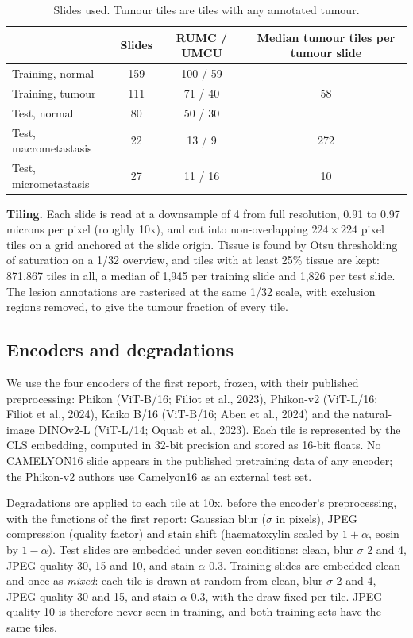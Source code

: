 \documentclass[11pt,a4paper]{article}
\begin{document}
\begin{table}[h]\centering\small
\caption{Slides used. Tumour tiles are tiles with any annotated tumour.}
\label{tab:data}
\begin{tabular}{@{}lccc@{}}
\toprule
 & Slides & RUMC / UMCU & Median tumour tiles per tumour slide\\
\midrule
Training, normal & 159 & 100 / 59 & \\
Training, tumour & 111 & 71 / 40 & 58\\
Test, normal & 80 & 50 / 30 & \\
Test, macrometastasis & 22 & 13 / 9 & 272\\
Test, micrometastasis & 27 & 11 / 16 & 10\\
\bottomrule
\end{tabular}
\end{table}

\textbf{Tiling.} Each slide is read at a downsample of 4 from full resolution, 0.91 to 0.97 microns per pixel (roughly 10x), and cut into non-overlapping $224 \times 224$ pixel tiles on a grid anchored at the slide origin. Tissue is found by Otsu thresholding of saturation on a 1/32 overview, and tiles with at least 25\% tissue are kept: 871,867 tiles in all, a median of 1,945 per training slide and 1,826 per test slide. The lesion annotations are rasterised at the same 1/32 scale, with exclusion regions removed, to give the tumour fraction of every tile.

\subsection{Encoders and degradations}

We use the four encoders of the first report, frozen, with their published preprocessing: Phikon (ViT-B/16; Filiot et al., 2023), Phikon-v2 (ViT-L/16; Filiot et al., 2024), Kaiko B/16 (ViT-B/16; Aben et al., 2024) and the natural-image DINOv2-L (ViT-L/14; Oquab et al., 2023). Each tile is represented by the CLS embedding, computed in 32-bit precision and stored as 16-bit floats. No CAMELYON16 slide appears in the published pretraining data of any encoder; the Phikon-v2 authors use Camelyon16 as an external test set.

Degradations are applied to each tile at 10x, before the encoder's preprocessing, with the functions of the first report: Gaussian blur ($\sigma$ in pixels), JPEG compression (quality factor) and stain shift (haematoxylin scaled by $1+\alpha$, eosin by $1-\alpha$). Test slides are embedded under seven conditions: clean, blur $\sigma$ 2 and 4, JPEG quality 30, 15 and 10, and stain $\alpha$ 0.3. Training slides are embedded clean and once as \emph{mixed}: each tile is drawn at random from clean, blur $\sigma$ 2 and 4, JPEG quality 30 and 15, and stain $\alpha$ 0.3, with the draw fixed per tile. JPEG quality 10 is therefore never seen in training, and both training sets have the same tiles.
\end{document}
